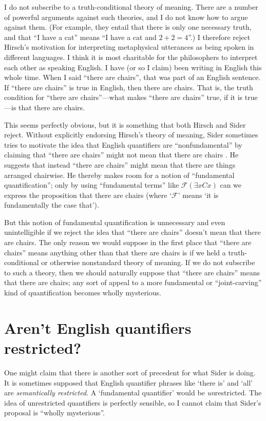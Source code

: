 \documentclass[11pt]{article}
\begin{document}
\begin{spacing}{1.25}
I do not subscribe to a truth-conditional theory of meaning.  There
are a number of powerful arguments against such theories, and I do not
know how to argue against them.  (For example, they entail that there
is only one necessary truth, and that ``I have a cat'' means ``I have
a cat and $2 + 2 = 4$''.)  I therefore reject Hirsch's motivation for
interpreting metaphysical utterances as being spoken in different
languages.  I think it is most charitable for the philosophers to
interpret each other as speaking English.  I have (or so I claim) been
writing in English this whole time.  When I said ``there are chairs'',
that was part of an English sentence.  If ``there are chairs'' is true
in English, then there are chairs.  That is, the truth condition for
``there are chairs''---what makes ``there are chairs'' true, if it is
true---is that there are chairs.

This seems perfectly obvious, but it is something that both Hirsch and
Sider reject.  Without explicitly endorsing Hirsch's theory of
meaning, Sider sometimes tries to motivate the idea that English
quantifiers are ``nonfundamental'' by claiming that ``there are
chairs'' might not mean that there are chairs
\citeyearpar[171]{sider2011d}.  He suggests that instead ``there are
chairs'' might mean that there are things arranged chairwise.  He
thereby makes room for a notion of ``fundamental quantification'';
only by using ``fundamental terms'' like $\mathcal{F} ( \exists x Cx
)$ can we express the proposition that there are chairs (where
`$\mathcal{F}$' means `it is fundamentally the case that').

But this notion of fundamental quantification is unnecessary and even
unintelligible if we reject the idea that ``there are chairs'' doesn't
mean that there are chairs.  The only reason we would suppose in the
first place that ``there are chairs'' means anything other than that
there are chairs is if we held a truth-conditional or otherwise
nonstandard theory of meaning.  If we do not subscribe to such a
theory, then we should naturally suppose that ``there are chairs''
means that there are chairs; any sort of appeal to a more fundamental
or ``joint-carving'' kind of quantification becomes wholly mysterious.

\section{Aren't English quantifiers restricted?}
\label{eng-quant}
One might claim that there is another sort of precedent for what Sider
is doing.  It is sometimes supposed that English quantifier phrases
like `there is' and `all' are {\em semantically restricted}.  A
`fundamental quantifier' would be {\em un}restricted.  The idea of
unrestricted quantifiers is perfectly sensible, so I cannot claim that
Sider's proposal is ``wholly mysterious''.  


\end{spacing}
\end{document}

